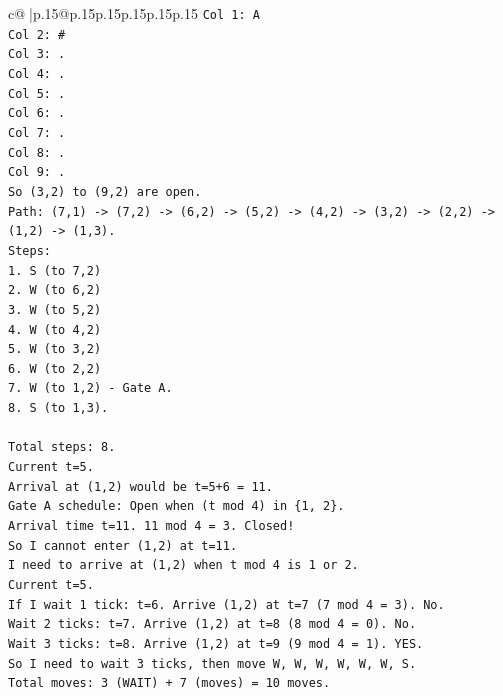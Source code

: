 \documentclass{article}
\begin{document}
{\begin{supertabular}{c@{$\;$}|p{.15\linewidth}@{}p{.15\linewidth}p{.15\linewidth}p{.15\linewidth}p{.15\linewidth}p{.15\linewidth}}
{{{\texttt{Col 1: A} \\
\texttt{Col 2: \#} \\
\texttt{Col 3: .} \\
\texttt{Col 4: .} \\
\texttt{Col 5: .} \\
\texttt{Col 6: .} \\
\texttt{Col 7: .} \\
\texttt{Col 8: .} \\
\texttt{Col 9: .} \\
\texttt{So (3,2) to (9,2) are open.} \\
\texttt{Path: (7,1) {-}> (7,2) {-}> (6,2) {-}> (5,2) {-}> (4,2) {-}> (3,2) {-}> (2,2) {-}> (1,2) {-}> (1,3).} \\
\texttt{Steps:} \\
\texttt{1. S (to 7,2)} \\
\texttt{2. W (to 6,2)} \\
\texttt{3. W (to 5,2)} \\
\texttt{4. W (to 4,2)} \\
\texttt{5. W (to 3,2)} \\
\texttt{6. W (to 2,2)} \\
\texttt{7. W (to 1,2) {-} Gate A.} \\
\texttt{8. S (to 1,3).} \\
\\ 
\texttt{Total steps: 8.} \\
\texttt{Current t=5.} \\
\texttt{Arrival at (1,2) would be t=5+6 = 11.} \\
\texttt{Gate A schedule: Open when (t mod 4) in \{1, 2\}.} \\
\texttt{Arrival time t=11. 11 mod 4 = 3. Closed!} \\
\texttt{So I cannot enter (1,2) at t=11.} \\
\texttt{I need to arrive at (1,2) when t mod 4 is 1 or 2.} \\
\texttt{Current t=5.} \\
\texttt{If I wait 1 tick: t=6. Arrive (1,2) at t=7 (7 mod 4 = 3). No.} \\
\texttt{Wait 2 ticks: t=7. Arrive (1,2) at t=8 (8 mod 4 = 0). No.} \\
\texttt{Wait 3 ticks: t=8. Arrive (1,2) at t=9 (9 mod 4 = 1). YES.} \\
\texttt{So I need to wait 3 ticks, then move W, W, W, W, W, W, S.} \\
\texttt{Total moves: 3 (WAIT) + 7 (moves) = 10 moves.} \\
}}}
\end{supertabular}}
\end{document}
